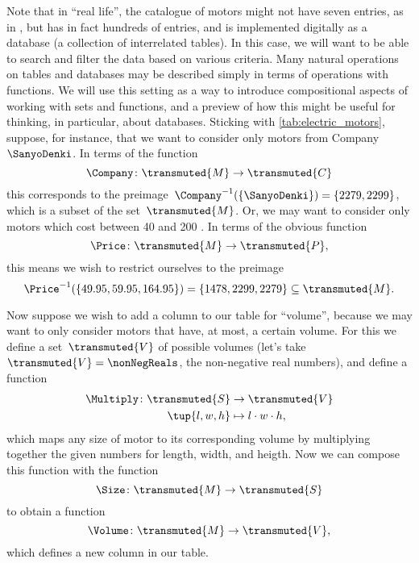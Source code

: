 Note that in ``real life'', the catalogue of motors might not have seven entries, as in \XXX, but has in fact hundreds of entries, and is implemented digitally as a database (a collection of interrelated tables).
In this case, we will want to be able to search and filter the data based on various criteria.
Many natural operations on tables and databases may be described simply in terms of operations with functions.
We will use this setting as a way to introduce compositional aspects of working with sets and functions, and a preview of how this might be useful for thinking, in particular, about databases.
Sticking with \cref{tab:electric_motors}, suppose, for instance, that we want to consider only motors from Company~$\SanyoDenki$.
In terms of the function
\begin{equation*}
	\Company\colon \transmuted{M} \to \transmuted{C}
\end{equation*}
this corresponds to the preimage~$\Company^{-1}(\{\SanyoDenki \}) = \{2279, 2299\}$, which is a subset of the set~$\transmuted{M}$.
Or, we may want to consider only motors which cost between 40 and 200 \USD.
In terms of the obvious function
\begin{equation*}
	\Price\colon \transmuted{M} \to \transmuted{P},
\end{equation*}
this means we wish to restrict ourselves to the preimage
\begin{equation*}
	\Price^{-1}(\{ 49.95, 59.95, 164.95\}) = \{ 1478, 2299, 2279 \} \subseteq \transmuted{M}.
\end{equation*}
%

Now suppose we wish to add a column to our table for ``volume'', because we may want to only consider motors that have, at most, a certain volume.
For this we define a set~$\transmuted{V}$ of possible volumes (let's take~$\transmuted{V} = \nonNegReals$, the non-negative real numbers), and define a function
\begin{equation*}
	\begin{aligned}
		\Multiply \colon \transmuted{S} & \to \transmuted{V}         \\
		\tup{l, w, h}                   & \mapsto l \cdot w \cdot h,
	\end{aligned}
\end{equation*}
%
which maps any size of motor to its corresponding volume by multiplying together the given numbers for length, width, and heigth.
Now we can compose this function with the function
%
\begin{equation*}
	\Size \colon \transmuted{M} \to \transmuted{S}
\end{equation*}
%
to obtain a function
%
\begin{equation*}
	\Volume\colon \transmuted{M} \to \transmuted{V},
\end{equation*}
%
which defines a new column in our table.

